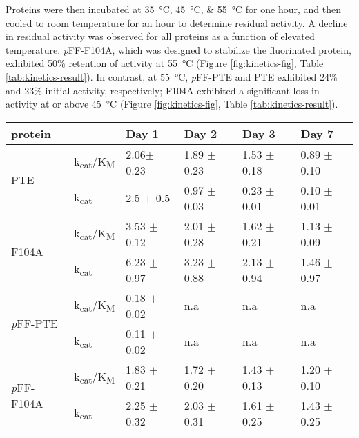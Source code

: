 \begin{refsection}
Proteins were then incubated at \SIlist{35;45;55}{\celsius} for one hour, and
then cooled to room temperature for an hour to determine residual activity. A
decline in residual activity was observed for all proteins as a function of
elevated temperature. \emph{p}FF-F104A, which was designed to stabilize the
fluorinated protein, exhibited 50\% retention of activity at \SI{55}{\celsius}
(Figure \ref{fig:kinetics-fig}, Table \ref{tab:kinetics-result}). In contrast,
at \SI{55}{\celsius}, \emph{p}FF-PTE and PTE exhibited 24\% and 23\% initial
activity, respectively; F104A exhibited a significant loss in activity at or
above \SI{45}{\celsius} (Figure \ref{fig:kinetics-fig}, Table
\ref{tab:kinetics-result}). 
\begin{table}[htbp]
\centering
    \begin{tabular}{llllll}
    \hline
    protein                 &  & Day 1 & Day 2 & Day 3 & Day 7\\ 
    \hline
    \multirow{2}{*}{PTE}    & k\textsubscript{cat}/K\textsubscript{M} & 2.06$
    \pm$ 0.23 & 1.89 $\pm$ 0.23 & 1.53 $\pm$ 0.18 & 0.89 $\pm$ 0.10 \\
    
    & k\textsubscript{cat} & 2.5 $\pm$ 0.5 & 0.97 $\pm$ 0.03 & 0.23 $\pm$ 0.01 & 0.10
    $\pm$ 0.01 \\
    \multirow{2}{*}{F104A}  & k\textsubscript{cat}/K\textsubscript{M} & 3.53
    $\pm$ 0.12 & 2.01 $\pm$ 0.28 & 1.62 $\pm$ 0.21 & 1.13 $\pm$ 0.09 \\ 
    
    & k\textsubscript{cat} & 6.23 $\pm$ 0.97 & 3.23 $\pm$ 0.88 & 2.13 $\pm$ 0.94 &
    1.46 $\pm$ 0.97 \\
    \multirow{2}{*}{\emph{p}FF-PTE} & k\textsubscript{cat}/K\textsubscript{M} &
    0.18 $\pm$ 0.02 & n.a & n.a & n.a \\ 
    
    & k\textsubscript{cat} & 0.11 $\pm$ 0.02 & n.a & n.a & n.a \\
    \multirow{2}{*}{\emph{p}FF-F104A} & k\textsubscript{cat}/K\textsubscript{M}
    & 1.83 $\pm$ 0.21 & 1.72 $\pm$ 0.20 & 1.43 $\pm$ 0.13 & 1.20 $\pm$ 0.10 \\

    & k\textsubscript{cat} & 2.25 $\pm$ 0.32 & 2.03 $\pm$ 0.31 & 1.61 $\pm$ 0.25 &
    1.43 $\pm$ 0.25 \\ 


\end{tabular}
\end{table}
\end{refsection}
